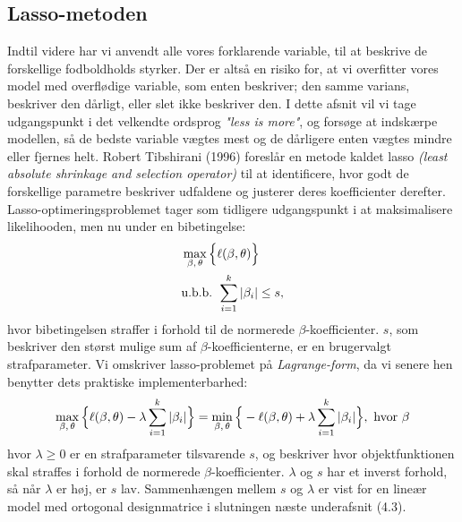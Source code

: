 \documentclass[11pt,a4paper]{article}
\begin{document}
\subsection{Lasso-metoden}
Indtil videre har vi anvendt alle vores forklarende variable, til at beskrive de forskellige fodboldholds styrker. Der er altså en risiko for, at vi overfitter vores model med overflødige variable, som enten beskriver; den samme varians, beskriver den dårligt, eller slet ikke beskriver den. I dette afsnit vil vi tage udgangspunkt i det velkendte ordsprog \textit{"less is more"}, og forsøge at indskærpe modellen, så de bedste variable vægtes mest og de dårligere enten vægtes mindre eller fjernes helt. Robert Tibshirani (1996)\cite{RobertTibshirani} foreslår en metode kaldet lasso \textit{(least absolute shrinkage and selection operator)} til at identificere, hvor godt de forskellige parametre beskriver udfaldene og justerer deres koefficienter derefter. Lasso-optimeringsproblemet tager som tidligere udgangspunkt i at maksimalisere likelihooden, men nu under en bibetingelse:
\begin{align*}
&\max_{\beta,\,\theta} \Big{\{}\ell(\beta,\theta)\Big{\}} \\
&\text{u.b.b. }\sum_{i=1}^k|\beta_i|\leq s,
\end{align*}
hvor bibetingelsen straffer i forhold til de normerede $\beta$-koefficienter. $s$, som beskriver den størst mulige sum af $\beta$-koefficienterne, er en brugervalgt strafparameter. 
Vi omskriver lasso-problemet på \textit{Lagrange-form}, da vi senere hen benytter dets praktiske implementerbarhed:
\begin{align*}
\max_{\beta,\,\theta} \Big{\{}\ell(\beta,\theta)-\lambda\sum_{i=1}^k|\beta_i|\Big{\}}=\min_{\beta,\,\theta} \Big{\{}-\ell(\beta,\theta)+\lambda\sum_{i=1}^k|\beta_i|\Big{\}},\text{ hvor }\beta
\end{align*}
hvor $\lambda\geq0$ er en strafparameter tilsvarende $s$, og beskriver hvor objektfunktionen skal straffes i forhold de normerede $\beta$-koefficienter. $\lambda$ og $s$ har et inverst forhold, så når $\lambda$ er høj, er $s$ lav. Sammenhængen mellem $s$ og $\lambda$ er vist for en lineær model med ortogonal designmatrice i slutningen næste underafsnit (4.3).
\end{document}
